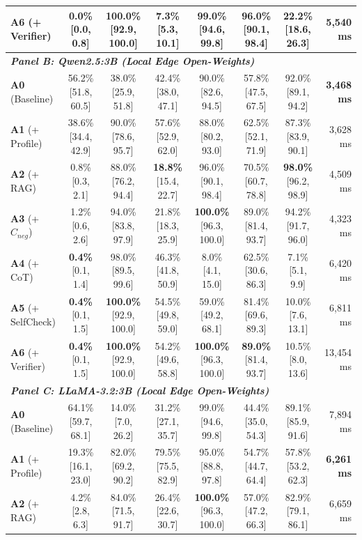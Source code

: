 \begin{table}[t]
\begin{tabular}{lccccccr}
\textbf{A6} (+ Verifier) & \textbf{0.0\%} [0.0, 0.8] & \textbf{100.0\%} [92.9, 100.0] & 7.3\% [5.3, 10.1] & 99.0\% [94.6, 99.8] & \textbf{96.0\%} [90.1, 98.4] & 22.2\% [18.6, 26.3] & 5,540 ms \\
\midrule
\multicolumn{8}{l}{\textit{\textbf{Panel B: Qwen2.5:3B (Local Edge Open-Weights)}}} \\
\textbf{A0} (Baseline) & 56.2\% [51.8, 60.5] & 38.0\% [25.9, 51.8] & 42.4\% [38.0, 47.1] & 90.0\% [82.6, 94.5] & 57.8\% [47.5, 67.5] & 92.0\% [89.1, 94.2] & \textbf{3,468 ms} \\
\textbf{A1} (+ Profile) & 38.6\% [34.4, 42.9] & 90.0\% [78.6, 95.7] & 57.6\% [52.9, 62.0] & 88.0\% [80.2, 93.0] & 62.5\% [52.1, 71.9] & 87.3\% [83.9, 90.1] & 3,628 ms \\
\textbf{A2} (+ RAG) & 0.8\% [0.3, 2.1] & 88.0\% [76.2, 94.4] & \textbf{18.8\%} [15.4, 22.7] & 96.0\% [90.1, 98.4] & 70.5\% [60.7, 78.8] & \textbf{98.0\%} [96.2, 98.9] & 4,509 ms \\
\textbf{A3} (+ $C_{neg}$) & 1.2\% [0.6, 2.6] & 94.0\% [83.8, 97.9] & 21.8\% [18.3, 25.9] & \textbf{100.0\%} [96.3, 100.0] & 89.0\% [81.4, 93.7] & 94.2\% [91.7, 96.0] & 4,323 ms \\
\textbf{A4} (+ CoT) & \textbf{0.4\%} [0.1, 1.4] & 98.0\% [89.5, 99.6] & 46.3\% [41.8, 50.9] & 8.0\% [4.1, 15.0] & 62.5\% [30.6, 86.3] & 7.1\% [5.1, 9.9] & 6,420 ms \\
\textbf{A5} (+ SelfCheck) & \textbf{0.4\%} [0.1, 1.5] & \textbf{100.0\%} [92.9, 100.0] & 54.5\% [49.8, 59.0] & 59.0\% [49.2, 68.1] & 81.4\% [69.6, 89.3] & 10.0\% [7.6, 13.1] & 6,811 ms \\
\textbf{A6} (+ Verifier) & \textbf{0.4\%} [0.1, 1.5] & \textbf{100.0\%} [92.9, 100.0] & 54.2\% [49.6, 58.8] & \textbf{100.0\%} [96.3, 100.0] & \textbf{89.0\%} [81.4, 93.7] & 10.5\% [8.0, 13.6] & 13,454 ms \\
\midrule
\multicolumn{8}{l}{\textit{\textbf{Panel C: LLaMA-3.2:3B (Local Edge Open-Weights)}}} \\
\textbf{A0} (Baseline) & 64.1\% [59.7, 68.1] & 14.0\% [7.0, 26.2] & 31.2\% [27.1, 35.7] & 99.0\% [94.6, 99.8] & 44.4\% [35.0, 54.3] & 89.1\% [85.9, 91.6] & 7,894 ms \\
\textbf{A1} (+ Profile) & 19.3\% [16.1, 23.0] & 82.0\% [69.2, 90.2] & 79.5\% [75.5, 82.9] & 95.0\% [88.8, 97.8] & 54.7\% [44.7, 64.4] & 57.8\% [53.2, 62.3] & \textbf{6,261 ms} \\
\textbf{A2} (+ RAG) & 4.2\% [2.8, 6.3] & 84.0\% [71.5, 91.7] & 26.4\% [22.6, 30.7] & \textbf{100.0\%} [96.3, 100.0] & 57.0\% [47.2, 66.3] & 82.9\% [79.1, 86.1] & 6,659 ms \\

\end{tabular}
\end{table}
